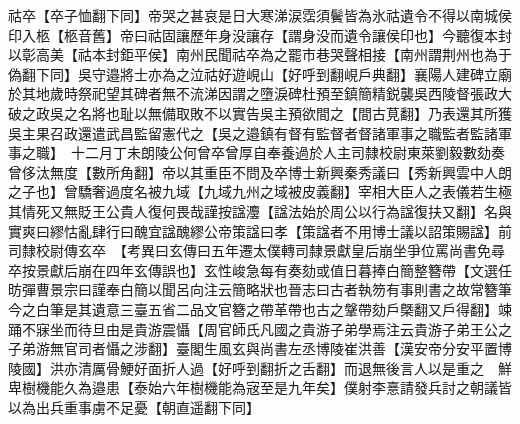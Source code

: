 祜卒【卒子恤翻下同】帝哭之甚哀是日大寒涕涙霑須鬢皆為氷祜遺令不得以南城侯印入柩【柩音舊】帝曰祜固讓歷年身没讓存【謂身没而遺令讓侯印也】今聽復本封以彰高美【祜本封鉅平侯】南州民聞祜卒為之罷市巷哭聲相接【南州謂荆州也為于偽翻下同】吳守邉將士亦為之泣祜好遊峴山【好呼到翻峴戶典翻】襄陽人建碑立廟於其地歲時祭祀望其碑者無不流涕因謂之墮淚碑杜預至鎮簡精鋭襲吳西陵督張政大破之政吳之名將也耻以無備取敗不以實告吳主預欲間之【間古莧翻】乃表還其所獲吳主果召政還遣武昌監留憲代之【吳之邉鎮有督有監督者督諸軍事之職監者監諸軍事之職】　十二月丁未朗陵公何曾卒曾厚自奉養過於人主司隸校尉東萊劉毅數劾奏曾侈汰無度【數所角翻】帝以其重臣不問及卒博士新興秦秀議曰【秀新興雲中人朗之子也】曾驕奢過度名被九域【九域九州之域被皮義翻】宰相大臣人之表儀若生極其情死又無貶王公貴人復何畏哉謹按諡灋【諡法始於周公以行為諡復扶又翻】名與實爽曰繆怙亂肆行曰醜宜諡醜繆公帝策諡曰孝【策諡者不用博士議以詔策賜諡】前司隸校尉傳玄卒　【考異曰玄傳曰五年遷太僕轉司隸景獻皇后崩坐爭位罵尚書免尋卒按景獻后崩在四年玄傳誤也】玄性峻急每有奏劾或值日暮捧白簡整簪帶【文選任昉彈曹景宗曰謹奉白簡以聞呂向注云簡略狀也晉志曰古者執笏有事則書之故常簪筆今之白筆是其遺意三臺五省二品文官簪之帶革帶也古之鞶帶劾戶槩翻又戶得翻】竦踊不寐坐而待旦由是貴游震懾【周官師氏凡國之貴游子弟學焉注云貴游子弟王公之子弟游無官司者懾之涉翻】臺閣生風玄與尚書左丞博陵崔洪善【漢安帝分安平置博陵國】洪亦清厲骨鯁好面折人過【好呼到翻折之舌翻】而退無後言人以是重之　鮮卑樹機能久為邉患【泰始六年樹機能為宼至是九年矣】僕射李憙請發兵討之朝議皆以為出兵重事虜不足憂【朝直遥翻下同】

